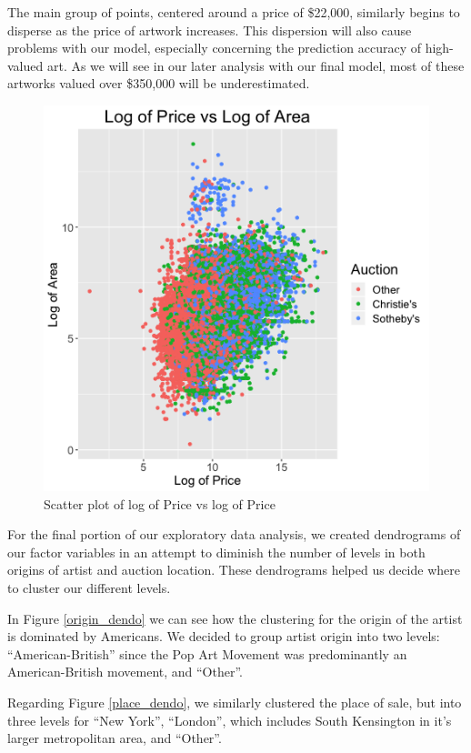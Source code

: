 \documentclass[]{asaproc}\usepackage[]{graphicx}\usepackage[]{color}
\begin{document}
The main group of points, centered around a price of \$22,000, similarly begins to disperse as the price of artwork increases. This dispersion will also cause problems with our model, especially concerning the prediction accuracy of high-valued art. As we will see in our later analysis with our final model, most of these artworks valued over \$350,000 will be underestimated.

\begin{figure}[H]

\includegraphics[scale = 0.5]{Area_SP}
\caption{Scatter plot of log of Price vs log of Price}
\label{area}
\end{figure}

For the final portion of our exploratory data analysis, we created dendrograms of our factor variables in an attempt to diminish the number of levels in both origins of artist and auction location. These dendrograms helped us decide where to cluster our different levels. 

In Figure \ref{origin_dendo} we can see how the clustering for the origin of the artist is dominated by Americans. We decided to group artist origin into two levels: ``American-British'' since the Pop Art Movement was predominantly an American-British movement, and ``Other''.

Regarding Figure \ref{place_dendo}, we similarly clustered the place of sale, but into three levels for ``New York'', ``London'', which includes South Kensington in it's larger metropolitan area, and ``Other''.
\end{document}
